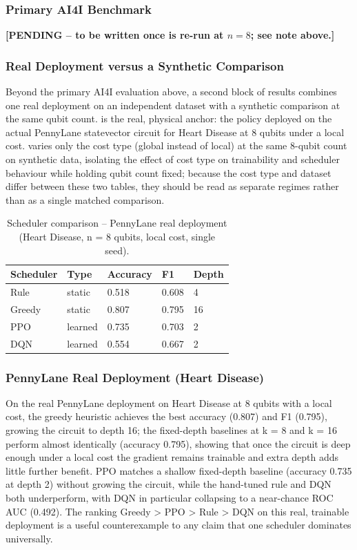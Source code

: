 \subsubsection{Primary AI4I Benchmark}
\textbf{[PENDING -- to be written once  is re-run at $n=8$; see note above.]}

\subsubsection{Real Deployment versus a Synthetic Comparison}
Beyond the primary AI4I evaluation above, a second block of results combines one real deployment on an independent dataset with a synthetic comparison at the same qubit count.  is the real, physical anchor: the policy deployed on the actual PennyLane statevector circuit for Heart Disease at 8 qubits under a local cost.  varies only the cost type (global instead of local) at the same 8-qubit count on synthetic data, isolating the effect of cost type on trainability and scheduler behaviour while holding qubit count fixed; because the cost type and dataset differ between these two tables, they should be read as separate regimes rather than as a single matched comparison.

\begin{table}[htbp]
\centering
\caption{Scheduler comparison -- PennyLane real deployment (Heart Disease, n = 8 qubits, local cost, single seed).}
\label{tab:heart}
\begin{tabular}{|p{3cm}|p{2cm}|p{2.3cm}|p{2cm}|p{2.5cm}|}
\hline
\textbf{Scheduler} & \textbf{Type} & \textbf{Accuracy} & \textbf{F1} & \textbf{Depth} \\
\hline
Rule & static & 0.518 & 0.608 & 4 \\
Greedy & static & 0.807 & 0.795 & 16 \\
PPO & learned & 0.735 & 0.703 & 2 \\
DQN & learned & 0.554 & 0.667 & 2 \\
\hline
\end{tabular}
\end{table}

\subsubsection{PennyLane Real Deployment (Heart Disease)}
On the real PennyLane deployment on Heart Disease at 8 qubits with a local cost, the greedy heuristic achieves the best accuracy (0.807) and F1 (0.795), growing the circuit to depth 16; the fixed-depth baselines at k = 8 and k = 16 perform almost identically (accuracy 0.795), showing that once the circuit is deep enough under a local cost the gradient remains trainable and extra depth adds little further benefit. PPO matches a shallow fixed-depth baseline (accuracy 0.735 at depth 2) without growing the circuit, while the hand-tuned rule and DQN both underperform, with DQN in particular collapsing to a near-chance ROC AUC (0.492). The ranking Greedy > PPO > Rule > DQN on this real, trainable deployment is a useful counterexample to any claim that one scheduler dominates universally.

